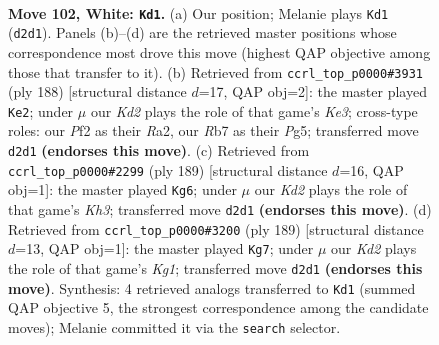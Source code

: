 \documentclass[11pt]{article}
\begin{document}
\clearpage

\begin{figure}[p]\centering
\begin{subfigure}{0.46\textwidth}\centering
\resizebox{\linewidth}{!}{%
\newchessgame
\chessboard[
  setfen={1B5k/1R6/4r3/7P/4p3/5p2/3K1P2/8 w - - 11 102},
  showmover=false,
  pgfstyle=straightmove, color=movearrow, markmove={d2-d1}
]}
\caption{}
\end{subfigure}\hfill
\begin{subfigure}{0.46\textwidth}\centering
\resizebox{\linewidth}{!}{%
\newchessgame
\chessboard[
  setfen={8/5p2/3k2pN/6P1/8/4K3/R7/5r2 w - - 54 95},
  showmover=false,
  pgfstyle=straightmove, color=movearrow, markmove={e3-e2}
]}
\caption{}
\end{subfigure}
\\[4pt]
\begin{subfigure}{0.46\textwidth}\centering
\resizebox{\linewidth}{!}{%
\newchessgame
\chessboard[
  setfen={8/8/7k/5R2/6p1/6P1/r4P2/2K5 b - - 95 95},
  showmover=false,
  pgfstyle=straightmove, color=movearrow, markmove={h6-g6}
]}
\caption{}
\end{subfigure}\hfill
\begin{subfigure}{0.46\textwidth}\centering
\resizebox{\linewidth}{!}{%
\newchessgame
\chessboard[
  setfen={6k1/r7/3K4/6Pp/5R1P/8/8/8 b - - 18 95},
  showmover=false,
  pgfstyle=straightmove, color=movearrow, markmove={g8-g7}
]}
\caption{}
\end{subfigure}
\caption{\textbf{Move 102, White: \texttt{Kd1}.} (a) Our position; Melanie plays \texttt{Kd1} (\texttt{d2d1}). Panels (b)--(d) are the retrieved master positions whose correspondence most drove this move (highest QAP objective among those that transfer to it). (b) Retrieved from \texttt{ccrl\_top\_p0000\#3931} (ply 188) [structural distance $d$=17, QAP obj=2]: the master played \texttt{Ke2}; under $\mu$ our \emph{Kd2} plays the role of that game's \emph{Ke3}; cross-type roles: our \emph{P}f2 as their \emph{R}a2, our \emph{R}b7 as their \emph{P}g5; transferred move \texttt{d2d1} \textbf{(endorses this move)}. (c) Retrieved from \texttt{ccrl\_top\_p0000\#2299} (ply 189) [structural distance $d$=16, QAP obj=1]: the master played \texttt{Kg6}; under $\mu$ our \emph{Kd2} plays the role of that game's \emph{Kh3}; transferred move \texttt{d2d1} \textbf{(endorses this move)}. (d) Retrieved from \texttt{ccrl\_top\_p0000\#3200} (ply 189) [structural distance $d$=13, QAP obj=1]: the master played \texttt{Kg7}; under $\mu$ our \emph{Kd2} plays the role of that game's \emph{Kg1}; transferred move \texttt{d2d1} \textbf{(endorses this move)}. Synthesis: 4 retrieved analogs transferred to \texttt{Kd1} (summed QAP objective 5, the strongest correspondence among the candidate moves); Melanie committed it via the \texttt{search} selector.}
\label{fig:thought-m202}
\end{figure}
\end{document}
